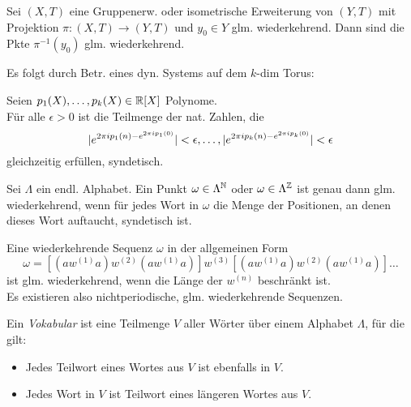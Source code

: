 \documentclass{cheat-sheet}
\begin{document}
\begin{thm}
  Sei $(X, T)$ eine Gruppenerw. oder isometrische Erweiterung von $(Y, T)$ mit Projektion $\pi : (X, T) \to (Y, T)$ und $y_0 \in Y$ glm. wiederkehrend.
  Dann sind die Pkte $\pi^{-1}(y_0)$ glm. wiederkehrend.
\end{thm}

\begin{bem}
  Es folgt durch Betr. eines dyn. Systems auf dem $k$-dim Torus:
\end{bem}

\begin{thm}
  Seien $p_1(X), \ldots, p_k(X) \in \mathbb{R}[X]$ Polynome. \\
  Für alle $\epsilon > 0$ ist die Teilmenge der nat. Zahlen, die
  \[
    \lvert e^{2 \pi i p_1(n) - e^{2 \pi i p_1(0)}}\rvert < \epsilon, \ldots,
    \lvert e^{2 \pi i p_k(n) - e^{2 \pi i p_k(0)}}\rvert < \epsilon
  \]
  gleichzeitig erfüllen, syndetisch.
\end{thm}


\begin{prop}
  Sei $\Lambda$ ein endl. Alphabet. Ein Punkt $\omega \in \Lambda^{\mathbb{N}}$ oder $\omega \in \Lambda^{\mathbb{Z}}$ ist genau dann glm. wiederkehrend, wenn für jedes Wort in $\omega$ die Menge der Positionen, an denen dieses Wort auftaucht, syndetisch ist.
\end{prop}

\begin{bem}
  Eine wiederkehrende Sequenz $\omega$ in der allgemeinen Form
  \[ \omega = [(aw^{(1)}a)w^{(2)}(aw^{(1)}a)]w^{(3)}[(aw^{(1)}a)w^{(2)}(aw^{(1)}a)]\ldots \]
  ist glm. wiederkehrend, wenn die Länge der $w^{(n)}$ beschränkt ist. \\
  Es existieren also nichtperiodische, glm. wiederkehrende Sequenzen.
\end{bem}

\begin{defn}
  Ein \emph{Vokabular} ist eine Teilmenge $V$ aller Wörter über einem Alphabet $\Lambda$, für die gilt:
  \begin{itemize}
    \item Jedes Teilwort eines Wortes aus $V$ ist ebenfalls in $V$.
    \item Jedes Wort in $V$ ist Teilwort eines längeren Wortes aus $V$.
  \end{itemize}
\end{defn}
\end{document}
